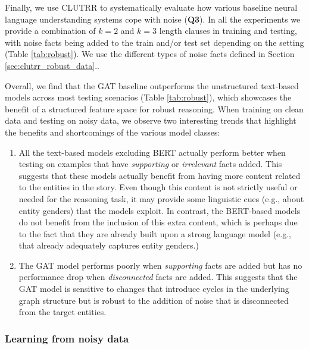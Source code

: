 \documentclass[letterpaper, 12pt]{report}
\begin{document}


Finally, we use CLUTRR to systematically evaluate how various baseline neural language understanding systems cope with noise (\textbf{Q3}).
In all the experiments we provide a combination of $k=2$ and $k=3$ length clauses in training and testing, with noise facts being added to the train and/or test set depending on the setting (Table \ref{tab:robust}).
We use the different types of noise facts defined in Section \ref{sec:clutrr_robust_data}..

Overall, we find that the GAT baseline outperforms the unstructured text-based models across most testing scenarios (Table \ref{tab:robust}), which showcases the benefit of a structured feature space for robust reasoning.
When training on clean data and testing on noisy data, we observe two interesting trends that highlight the benefits and shortcomings of the various model classes:
\begin{enumerate}[leftmargin=*, topsep=2pt, itemsep=0pt]
    \item All the text-based models excluding BERT actually perform better when testing on examples that have {\em supporting} or {\em irrelevant} facts added. This suggests that these models actually benefit from having more content related to the entities in the story. Even though this content is not strictly useful or needed for the reasoning task, it may provide some linguistic cues (e.g., about entity genders) that the models exploit. In contrast, the BERT-based models do not benefit from the inclusion of this extra content, which is perhaps due to the fact that they are already built upon a strong language model (e.g., that already adequately captures entity genders.)
    \item  The GAT model performs poorly when {\em supporting} facts are added but has no performance drop when {\em disconnected} facts are added. This suggests that the GAT model is sensitive to changes that introduce cycles in the underlying graph structure but is robust to the addition of noise that is disconnected from the target entities.
\end{enumerate}

\subsubsection{Learning from noisy data}
\end{document}
